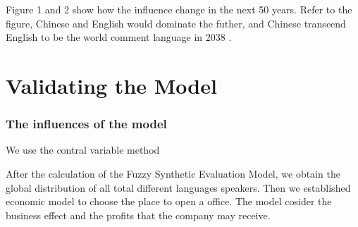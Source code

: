 \documentclass{mcmthesis}
\begin{document}
Figure 1 and 2 show how the influence change in the next 50 years. Refer to the figure, Chinese and English would dominate the futher, 
and Chinese transcend English to be the world comment language in 2038 .

\section{Validating the Model}
\subsubsection{The influences of the model}
\qquad We use the contral variable method



After the calculation of the Fuzzy Synthetic Evaluation Model, we obtain the global distribution of all total different languages speakers. Then we established economic model to choose the place to open a office.
The model cosider the business effect and the profits that the company may receive.
\end{document}
